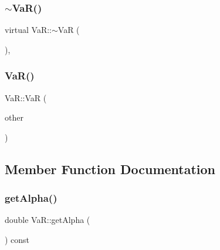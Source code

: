\hypertarget{classVaR_af1492f7ffa13239a77af0a2c647f8358}{}\label{classVaR_af1492f7ffa13239a77af0a2c647f8358} 
\subsubsection{\texorpdfstring{$\sim$\+Va\+R()}{~VaR()}}
{\footnotesize\ttfamily virtual Va\+R\+::$\sim$\+VaR (\begin{DoxyParamCaption}{ }\end{DoxyParamCaption})\hspace{0.3cm}{\ttfamily [inline]}, {\ttfamily [virtual]}}

\hypertarget{classVaR_a21cafaf403766ed1f5ba3d957357d789}{}\label{classVaR_a21cafaf403766ed1f5ba3d957357d789} 
\subsubsection{\texorpdfstring{Va\+R()}{VaR()}\hspace{0.1cm}{\footnotesize\ttfamily [2/2]}}
{\footnotesize\ttfamily Va\+R\+::\+VaR (\begin{DoxyParamCaption}\item[{const \hyperlink{classVaR}{VaR} \&}]{other }\end{DoxyParamCaption})}



\subsection{Member Function Documentation}
\hypertarget{classVaR_aa2c6adc33bdf14b0908f4586254726c9}{}\label{classVaR_aa2c6adc33bdf14b0908f4586254726c9} 
\subsubsection{\texorpdfstring{get\+Alpha()}{getAlpha()}}
{\footnotesize\ttfamily double Va\+R\+::get\+Alpha (\begin{DoxyParamCaption}{ }\end{DoxyParamCaption}) const}

\hypertarget{classVaR_a28e1a1be9e386ed4e8503e54db4033bd}{}\label{classVaR_a28e1a1be9e386ed4e8503e54db4033bd} 

